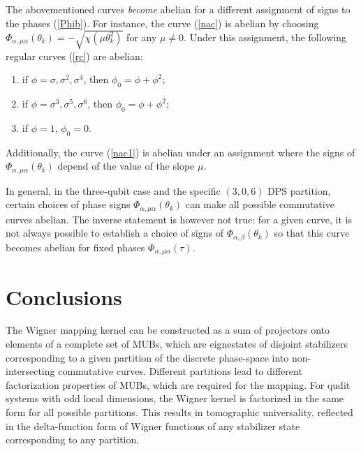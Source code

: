 \documentclass[quantumrep,article,submit,pdftex,moreauthors]{Definitions/mdpi}
\begin{document}
The abovementioned curves \textit{become} abelian for a different assignment of
signs to the phases (\ref{Phib}). For instance, the curve (\ref{nac}) is abelian
by choosing $\Phi_{\alpha,\mu \alpha }(\theta_{k}) = -\sqrt{\chi\left(\mu
\theta_{k}^{2}\right)}$ for any $\mu \neq 0$. Under this assignment, the
following regular curves (\ref{rc}) are abelian:

\begin{enumerate}
  \item if $\phi = \sigma, \sigma^{2}, \sigma^{4}$, then $\phi_{0} = \phi +
    \phi^{2}$;

  \item if $\phi = \sigma^{3}, \sigma^{5}, \sigma^{6}$, then $\phi_{0} = \phi +
    \phi^{2}$;

  \item if $\phi = 1$, $\phi_{0} = 0$.
\end{enumerate}

Additionally, the curve (\ref{nac1}) is abelian under an assignment where the
signs of $\Phi_{\alpha,\mu \alpha}(\theta_{k})$ depend of the value of the slope
$\mu$.

In general, in the three-qubit case and the specific $(3,0,6)$ DPS partition,
certain choices of phase signs $\Phi_{\alpha,\mu \alpha}(\theta_{k})$ can make
all possible commutative curves abelian. The inverse statement is however not
true: for a given curve, it is not always possible to establish a choice of
signs of $\Phi_{\alpha,\beta }(\theta_{k})$ so that this curve becomes abelian
for fixed phases $\Phi_{\alpha,\mu \alpha}(\tau)$.


\section{Conclusions}

The Wigner mapping kernel can be constructed as a sum of projectors onto
elements of a complete set of MUBs, which are eignestates of disjoint
stabilizers corresponding to a given partition of the discrete phase-space into
non-intersecting commutative curves. Different partitions lead to different
factorization properties of MUBs, which are required for the mapping. For qudit
systems with odd local dimensions, the Wigner kernel is factorized in the same
form for all possible partitions. This results in tomographic universality,
reflected in the delta-function form of Wigner functions of any stabilizer state
corresponding to any partition.
\end{document}
